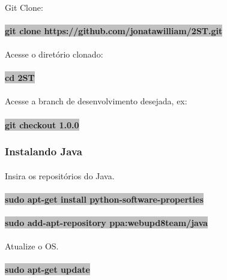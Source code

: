\documentclass[	DIV=calc,%
							paper=a4,%
							fontsize=12pt,%
							onecolumn]{scrartcl}	 					%
\begin{document}
\paragraph{}
Git Clone:
\paragraph{}
\textbf{\colorbox{Silver}{git clone https://github.com/jonatawilliam/2ST.git}}
\paragraph{}
Acesse o diretório clonado:
\paragraph{}
\textbf{\colorbox{Silver}{cd 2ST}}
\paragraph{}
Acesse a branch de desenvolvimento desejada, ex:
\paragraph{}
\textbf{\colorbox{Silver}{git checkout 1.0.0}}

\subsubsection{Instalando Java}
\paragraph{}
Insira os repositórios do Java.
\paragraph{}
\textbf{\colorbox{Silver}{sudo apt-get install python-software-properties}}
\paragraph{}
\textbf{\colorbox{Silver}{sudo add-apt-repository ppa:webupd8team/java}}
\paragraph{}
Atualize o OS.
\paragraph{}
\textbf{\colorbox{Silver}{sudo apt-get update}}
\end{document}
